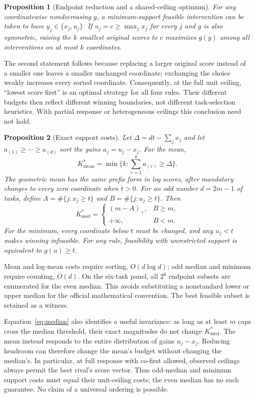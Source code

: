 \documentclass{article}
\newtheorem{proposition}{Proposition}
\newcommand{\K}{K^*}
\newcommand{\mean}{\mathrm{mean}}
\newcommand{\med}{\mathrm{med}}
\begin{document}
\begin{proposition}[Endpoint reduction and a shared-ceiling optimum]
\label{prop:endpoint}
For any coordinatewise nondecreasing $g$, a minimum-support feasible intervention
can be taken to have $y_j\in\{x_j,u_j\}$. If $u_j=c\ge\max_jx_j$ for every $j$ and
$g$ is also symmetric, raising the $k$ smallest original scores to $c$ maximizes
$g(y)$ among all interventions on at most $k$ coordinates.
\end{proposition}
The second statement follows because replacing a larger original score instead of
a smaller one leaves a smaller unchanged coordinate; exchanging the choice weakly
increases every sorted coordinate. Consequently, at the full unit ceiling,
``lowest score first'' is an optimal strategy for all four rules. Their different
budgets then reflect different winning boundaries, not different task-selection
heuristics. With partial response or heterogeneous ceilings this conclusion need
not hold.

\begin{proposition}[Exact support costs]
\label{prop:support}
Let $\Delta=dt-\sum_jx_j$ and let $a_{(1)}\ge\cdots\ge a_{(d)}$ sort the gains
$a_j=u_j-x_j$. For the mean,
\begin{equation}
 \K_\mean=\min\{k:\textstyle\sum_{r=1}^k a_{(r)}\ge\Delta\}.
 \label{eq:mean}
\end{equation}
The geometric mean has the same prefix form in log scores, after mandatory changes
to every zero coordinate when $t>0$. For an odd number $d=2m-1$ of tasks, define
$A=\#\{j:x_j\ge t\}$ and $B=\#\{j:u_j\ge t\}$. Then
\begin{equation}
 \K_\med=\begin{cases}(m-A)_+,&B\ge m,\\+\infty,&B<m.\end{cases}
 \label{eq:median}
\end{equation}
For the minimum, every coordinate below $t$ must be changed, and any $u_j<t$
makes winning infeasible. For any rule, feasibility with unrestricted support is
equivalent to $g(u)\ge t$.
\end{proposition}
Mean and log-mean costs require sorting, $O(d\log d)$; odd median and minimum
require counting, $O(d)$. On the six-task panel, all $2^6$ endpoint subsets are
enumerated for the even median. This avoids substituting a nonstandard lower or
upper median for the official mathematical convention. The best feasible subset
is retained as a witness.

Equation~\ref{eq:median} also identifies a useful invariance: as long as at least
$m$ caps cross the median threshold, their exact magnitudes do not change $K^*_\med$.
The mean instead responds to the entire distribution of gains $u_j-x_j$. Reducing
headroom can therefore change the mean's budget without changing the median's.
In particular, at full response with co-first allowed, observed ceilings always
permit the best rival's score vector. Thus odd-median and minimum support costs
must equal their unit-ceiling costs; the even median has no such guarantee.
No claim of a universal ordering is possible.
\end{document}
